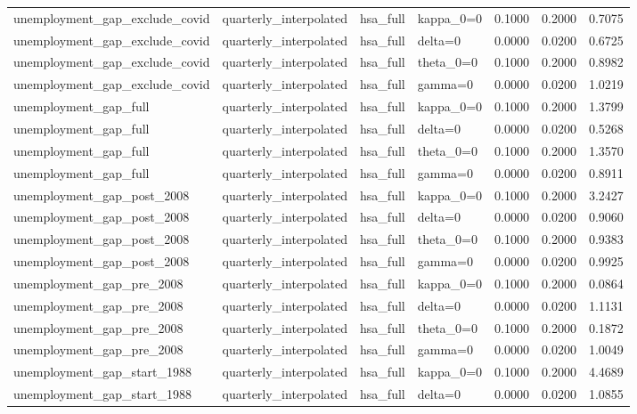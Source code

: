 \begin{tabular}{llllrrr}
unemployment\_gap\_exclude\_covid & quarterly\_interpolated & hsa\_full & kappa\_0=0 & 0.1000 & 0.2000 & 0.7075 \\
unemployment\_gap\_exclude\_covid & quarterly\_interpolated & hsa\_full & delta=0 & 0.0000 & 0.0200 & 0.6725 \\
unemployment\_gap\_exclude\_covid & quarterly\_interpolated & hsa\_full & theta\_0=0 & 0.1000 & 0.2000 & 0.8982 \\
unemployment\_gap\_exclude\_covid & quarterly\_interpolated & hsa\_full & gamma=0 & 0.0000 & 0.0200 & 1.0219 \\
unemployment\_gap\_full & quarterly\_interpolated & hsa\_full & kappa\_0=0 & 0.1000 & 0.2000 & 1.3799 \\
unemployment\_gap\_full & quarterly\_interpolated & hsa\_full & delta=0 & 0.0000 & 0.0200 & 0.5268 \\
unemployment\_gap\_full & quarterly\_interpolated & hsa\_full & theta\_0=0 & 0.1000 & 0.2000 & 1.3570 \\
unemployment\_gap\_full & quarterly\_interpolated & hsa\_full & gamma=0 & 0.0000 & 0.0200 & 0.8911 \\
unemployment\_gap\_post\_2008 & quarterly\_interpolated & hsa\_full & kappa\_0=0 & 0.1000 & 0.2000 & 3.2427 \\
unemployment\_gap\_post\_2008 & quarterly\_interpolated & hsa\_full & delta=0 & 0.0000 & 0.0200 & 0.9060 \\
unemployment\_gap\_post\_2008 & quarterly\_interpolated & hsa\_full & theta\_0=0 & 0.1000 & 0.2000 & 0.9383 \\
unemployment\_gap\_post\_2008 & quarterly\_interpolated & hsa\_full & gamma=0 & 0.0000 & 0.0200 & 0.9925 \\
unemployment\_gap\_pre\_2008 & quarterly\_interpolated & hsa\_full & kappa\_0=0 & 0.1000 & 0.2000 & 0.0864 \\
unemployment\_gap\_pre\_2008 & quarterly\_interpolated & hsa\_full & delta=0 & 0.0000 & 0.0200 & 1.1131 \\
unemployment\_gap\_pre\_2008 & quarterly\_interpolated & hsa\_full & theta\_0=0 & 0.1000 & 0.2000 & 0.1872 \\
unemployment\_gap\_pre\_2008 & quarterly\_interpolated & hsa\_full & gamma=0 & 0.0000 & 0.0200 & 1.0049 \\
unemployment\_gap\_start\_1988 & quarterly\_interpolated & hsa\_full & kappa\_0=0 & 0.1000 & 0.2000 & 4.4689 \\
unemployment\_gap\_start\_1988 & quarterly\_interpolated & hsa\_full & delta=0 & 0.0000 & 0.0200 & 1.0855 \\

\end{tabular}
